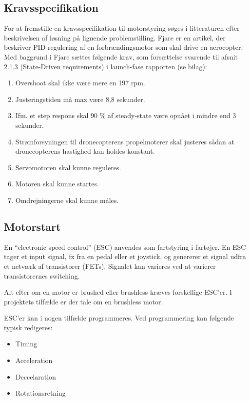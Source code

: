 \subsection{Kravsspecifikation}
\label{sec:kravsspecifikation}
For at fremstille en kravsspecifikation til motorstyring søges i litteraturen efter beskrivelsen af løsning på lignende problemstilling. Fjare\autocite{pid1} er en artikel, der beskriver PID-regulering af en forbrændingsmotor som skal drive en aerocopter. Med baggrund i Fjare\autocite{pid1} sættes følgende krav, som forsættelse svarende til afsnit 2.1.3 (State-Driven requirements) i launch-fase rapporten (se bilag):
\begin{enumerate}[label=2.1.3.\arabic*]
\item Overshoot skal ikke være mere en 197 rpm.
\item Justeringstiden må max være 8,8 sekunder.
\item Ifm. et step respons skal 90 \% af steady-state være opnået i mindre end 3 sekunder.
\item Strømforsyningen til dronecopterens propelmoterer skal justeres sådan at dronecopterens hastighed kan holdes konstant.%
\item Servomotoren skal kunne reguleres.
\item Motoren skal kunne startes.
\item Omdrejningerne skal kunne måles.
\end{enumerate}

\subsection{Motorstart}
\label{sec:esc}

En ``electronic speed control'' (ESC) anvendes som fartstyring i fartøjer. En ESC tager et input signal, fx fra en pedal eller et joystick, og genererer et signal udfra et netværk af transistorer (FETs). Signalet kan varieres ved at varierer transistorernes switching.

Alt efter om en motor er brushed eller brushless kræves forskellige ESC'er. I projektets tilfælde er der tale om en brushless motor. 

ESC'er kan i nogen tilfælde programmeres. Ved programmering kan følgende typisk redigeres:
\begin{itemize}
\item Timing
\item Acceleration
\item Deccelaration
\item Rotationsretning
\end{itemize}

